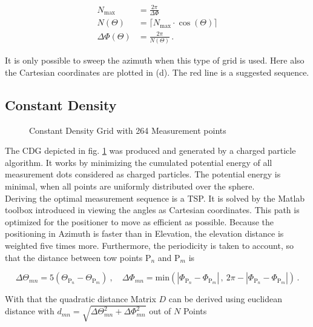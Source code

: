 \begin{align*}
N_{\text{max}} &= \frac{2\pi}{\Delta\Phi}\\
N\left(\Theta\right)&=\lceil N_{\text{max}}\cdot\cos\left(\Theta\right)\rceil\\
\Delta\Phi\left(\Theta\right) &= \frac{2\pi}{N\left(\Theta\right)}\,.
\end{align*}

It is only possible to sweep the azimuth when this type of grid is used. Here also the Cartesian coordinates are plotted in (d). The red line is a suggested sequence.

\subsection{Constant Density}

\begin{figure}[h]
  \centering
  \centering
\caption{Constant Density Grid with 264 Measurement points}
\label{fig:cdg}
\end{figure}

The \ac{CDG} depicted in fig. \ref{fig:cdg} was produced and generated by a charged particle algorithm. It works by minimizing the cumulated potential energy of all measurement dots considered as charged particles. The potential energy is minimal, when all points are uniformly distributed over the sphere.\\ 
Deriving the optimal measurement sequence is a \ac{TSP}. It is solved by the Matlab toolbox introduced in \cite{tsp} viewing the angles as Cartesian coordinates. This path is optimized for the positioner to move as efficient as possible. Because the positioning in Azimuth is faster than in Elevation, the elevation distance is weighted five times more. Furthermore, the periodicity is taken to account, so that the distance between tow points $\text{P}_n$ and $\text{P}_m$ is

\begin{equation}
\Delta\Theta_{mn} = 5\left(\Theta_{\text{P}_n}-\Theta_{\text{P}_m}\right)\ ,\quad \Delta\Phi_{mn} = \text{min}\left(|\Phi_{\text{P}_n}-\Phi_{\text{P}_m}|\, ,\ 2\pi-|\Phi_{\text{P}_n}-\Phi_{\text{P}_m}|\right)\,.
\end{equation}

With that the quadratic distance Matrix $D$ can be derived using euclidean distance with $d_{mn} = \sqrt{\Delta\Theta_{mn}^2+\Delta\Phi_{mn}^2}$ out of $N$ Points

